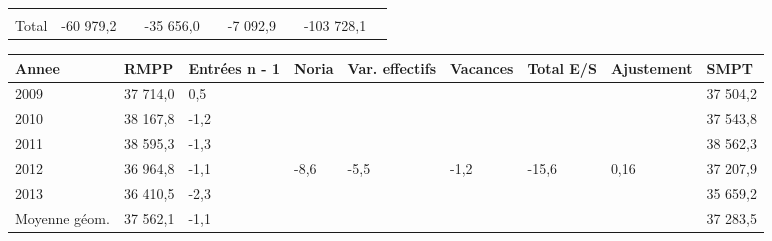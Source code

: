 \begin{longtable}[]{@{}lllllllll@{}}
\begin{minipage}[t]{0.06\columnwidth}
\strut
\end{minipage} & \begin{minipage}[t]{0.12\columnwidth}\raggedright
\strut
\end{minipage} & \begin{minipage}[t]{0.06\columnwidth}\raggedright
\strut
\end{minipage} & \begin{minipage}[t]{0.09\columnwidth}\raggedright
\strut
\end{minipage} & \begin{minipage}[t]{0.06\columnwidth}\raggedright
\strut
\end{minipage}\tabularnewline
\begin{minipage}[t]{0.05\columnwidth}\raggedright
Total\strut
\end{minipage} & \begin{minipage}[t]{0.10\columnwidth}\raggedright
-60 979,2\strut
\end{minipage} & \begin{minipage}[t]{0.06\columnwidth}\raggedright
\strut
\end{minipage} & \begin{minipage}[t]{0.16\columnwidth}\raggedright
-35 656,0\strut
\end{minipage} & \begin{minipage}[t]{0.06\columnwidth}\raggedright
\strut
\end{minipage} & \begin{minipage}[t]{0.12\columnwidth}\raggedright
-7 092,9\strut
\end{minipage} & \begin{minipage}[t]{0.06\columnwidth}\raggedright
\strut
\end{minipage} & \begin{minipage}[t]{0.09\columnwidth}\raggedright
-103 728,1\strut
\end{minipage} & \begin{minipage}[t]{0.06\columnwidth}\raggedright
\strut
\end{minipage}\tabularnewline
\bottomrule
\end{longtable}

\begin{longtable}[]{@{}lllllllll@{}}
\toprule
Annee & RMPP & Entrées n - 1 & Noria & Var. effectifs & Vacances & Total
E/S & Ajustement & SMPT\tabularnewline
\midrule
\endhead
2009 & 37 714,0 & 0,5 & & & & & & 37 504,2\tabularnewline
2010 & 38 167,8 & -1,2 & & & & & & 37 543,8\tabularnewline
2011 & 38 595,3 & -1,3 & & & & & & 38 562,3\tabularnewline
2012 & 36 964,8 & -1,1 & -8,6 & -5,5 & -1,2 & -15,6 & 0,16 & 37
207,9\tabularnewline
2013 & 36 410,5 & -2,3 & & & & & & 35 659,2\tabularnewline
Moyenne géom. & 37 562,1 & -1,1 & & & & & & 37 283,5\tabularnewline
\bottomrule
\end{longtable}

